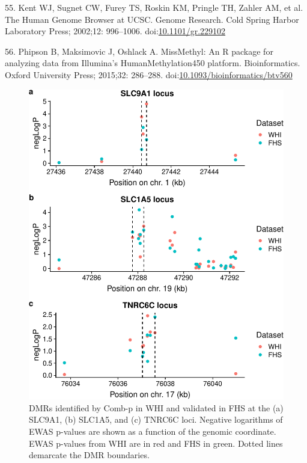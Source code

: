 \documentclass[]{article}
\theoremstyle{definition}
\theoremstyle{definition}
\theoremstyle{definition}
\theoremstyle{remark}
\begin{document}
55. Kent WJ, Sugnet CW, Furey TS, Roskin KM, Pringle TH, Zahler AM, et
al. The Human Genome Browser at UCSC. Genome Research. Cold Spring
Harbor Laboratory Press; 2002;12: 996--1006.
doi:\href{http://dx.doi.org/10.1101/gr.229102}{10.1101/gr.229102}

56. Phipson B, Maksimovic J, Oshlack A. MissMethyl: An R package for
analyzing data from Illumina's HumanMethylation450 platform.
Bioinformatics. Oxford University Press; 2015;32: 286--288.
doi:\href{http://dx.doi.org/10.1093/bioinformatics/btv560}{10.1093/bioinformatics/btv560}

\begin{figure}[htbp]
\centering
\includegraphics{../doc/module_ewas/figures/print-combp-plots-1.pdf}
\caption{\label{fig:print-combp-plots}DMRs identified by Comb-p in WHI and
validated in FHS at the (a) SLC9A1, (b) SLC1A5, and (c) TNRC6C loci.
Negative logarithms of EWAS p-values are shown as a function of the
genomic coordinate. EWAS p-values from WHI are in red and FHS in green.
Dotted lines demarcate the DMR boundaries.}
\end{figure}
\end{document}
